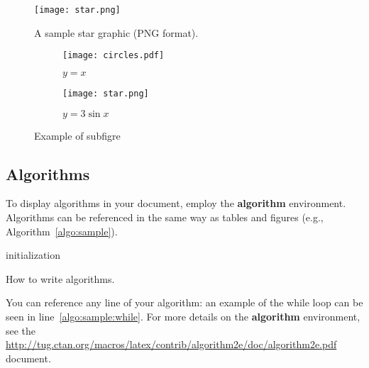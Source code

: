 \begin{figure}
    \centering
    \texttt{[image: star.png]}
    \caption{A sample star graphic (PNG format).}
    \label{fig:star}
\end{figure}


\begin{figure}
    \centering
    \begin{subfigure}[b]{0.3\textwidth}
        \centering
        \texttt{[image: circles.pdf]}
        \caption{$y=x$}
        \label{fig:circle}
    \end{subfigure}
    \hfill
    \begin{subfigure}[b]{0.3\textwidth}
        \centering
        \texttt{[image: star.png]}
        \caption{$y=3\sin x$}
        \label{fig:star2}
    \end{subfigure}
       \caption{Example of subfigre}
       \label{fig:two_images}
\end{figure}


\subsection{Algorithms}

To display algorithms in your document, employ the \textbf{algorithm} environment.
Algorithms can be referenced in the same way as tables and
figures (e.g., Algorithm~\ref{algo:sample}).

\begin{algorithm}
    \SetAlgoLined
    initialization\;
    \caption{How to write algorithms.}
    \label{algo:sample}
\end{algorithm}

You can reference any line of your algorithm: an example of the while loop can be seen in line~\ref{algo:sample:while}.
For more details on the \textbf{algorithm} environment, see the \url{http://tug.ctan.org/macros/latex/contrib/algorithm2e/doc/algorithm2e.pdf} document.